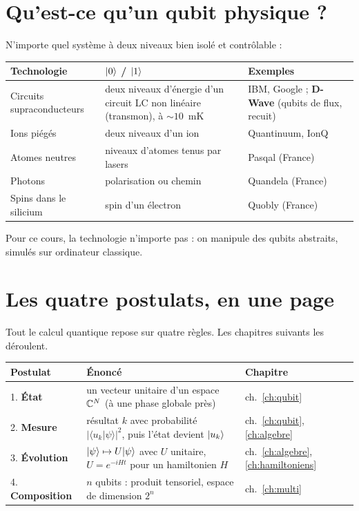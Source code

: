 \section{Qu'est-ce qu'un qubit physique ?}
N'importe quel système à deux niveaux bien isolé et contrôlable :
\begin{center}
\begin{tabular}{p{4.2cm}p{5.2cm}p{4.6cm}}
\toprule
Technologie & $\lvert 0\rangle$ / $\lvert 1\rangle$ & Exemples\\
\midrule
Circuits supraconducteurs & deux niveaux d'énergie d'un circuit LC non linéaire (transmon), à $\sim10$~mK & IBM, Google ; \textbf{D-Wave} (qubits de flux, recuit)\\
Ions piégés & deux niveaux d'un ion & Quantinuum, IonQ\\
Atomes neutres & niveaux d'atomes tenus par lasers & Pasqal (France)\\
Photons & polarisation ou chemin & Quandela (France)\\
Spins dans le silicium & spin d'un électron & Quobly (France)\\
\bottomrule
\end{tabular}
\end{center}
Pour ce cours, la technologie n'importe pas : on manipule des qubits abstraits, simulés sur ordinateur classique.

\section{Les quatre postulats, en une page}
Tout le calcul quantique repose sur quatre règles. Les chapitres suivants les déroulent.
\begin{center}
\begin{tabular}{p{2.6cm}p{6.6cm}p{4.3cm}}
\toprule
Postulat & Énoncé & Chapitre\\
\midrule
1. \textbf{État} & un vecteur unitaire d'un espace $\mathbb{C}^N$ (à une phase globale près) & ch.~\ref{ch:qubit}\\
2. \textbf{Mesure} & résultat $k$ avec probabilité $|\langle u_k|\psi\rangle|^2$, puis l'état devient $\lvert u_k\rangle$ & ch.~\ref{ch:qubit}, \ref{ch:algebre}\\
3. \textbf{Évolution} & $\lvert \psi\rangle\mapsto U\lvert \psi\rangle$ avec $U$ unitaire, $U=e^{-iHt}$ pour un hamiltonien $H$ & ch.~\ref{ch:algebre}, \ref{ch:hamiltoniens}\\
4. \textbf{Composition} & $n$ qubits : produit tensoriel, espace de dimension $2^n$ & ch.~\ref{ch:multi}\\
\bottomrule
\end{tabular}
\end{center}

